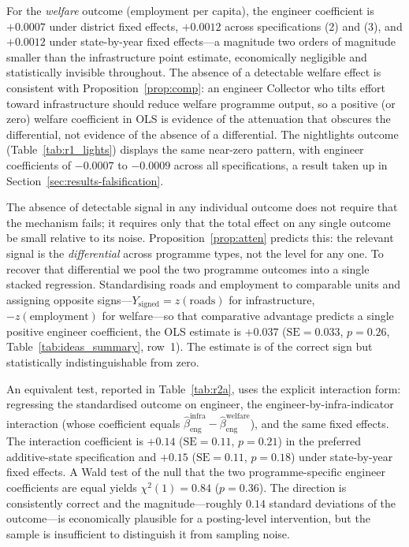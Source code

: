 For the \emph{welfare} outcome (employment per capita), the engineer coefficient is
$+0.0007$ under district fixed effects, $+0.0012$ across specifications (2) and (3),
and $+0.0012$ under state-by-year fixed effects---a magnitude two orders of magnitude
smaller than the infrastructure point estimate, economically negligible and statistically
invisible throughout. The absence of a detectable welfare effect is consistent with
Proposition~\ref{prop:comp}: an engineer Collector who tilts effort toward infrastructure
should reduce welfare programme output, so a positive (or zero) welfare coefficient in
OLS is evidence of the attenuation that obscures the differential, not evidence of
the absence of a differential. The nightlights outcome (Table~\ref{tab:r1_lights})
displays the same near-zero pattern, with engineer coefficients of $-0.0007$ to $-0.0009$
across all specifications, a result taken up in Section~\ref{sec:results-falsification}.

The absence of detectable signal in any individual outcome does not require that the
mechanism fails; it requires only that the total effect on any single outcome be small
relative to its noise. Proposition~\ref{prop:atten} predicts this: the relevant signal
is the \emph{differential} across programme types, not the level for any one. To
recover that differential we pool the two programme outcomes into a single stacked
regression. Standardising roads and employment to comparable units and assigning
opposite signs---$Y_{\text{signed}} = z(\text{roads})$ for infrastructure,
$-z(\text{employment})$ for welfare---so that comparative advantage predicts a single
positive engineer coefficient, the OLS estimate is $+0.037$ ($\text{SE}=0.033$,
$p=0.26$, Table~\ref{tab:ideas_summary}, row~1). The estimate is of the correct sign
but statistically indistinguishable from zero.

An equivalent test, reported in Table~\ref{tab:r2a}, uses the explicit
interaction form: regressing the standardised outcome on engineer, the
engineer-by-infra-indicator interaction (whose coefficient equals
$\hat\beta_{\text{eng}}^{\text{infra}} - \hat\beta_{\text{eng}}^{\text{welfare}}$),
and the same fixed effects. The interaction coefficient is $+0.14$ ($\text{SE}=0.11$,
$p=0.21$) in the preferred additive-state specification and $+0.15$ ($\text{SE}=0.11$,
$p=0.18$) under state-by-year fixed effects. A Wald test of the null that the two
programme-specific engineer coefficients are equal yields $\chi^2(1)=0.84$ ($p=0.36$).
The direction is consistently correct and the magnitude---roughly $0.14$ standard
deviations of the outcome---is economically plausible for a posting-level intervention,
but the sample is insufficient to distinguish it from sampling noise.


